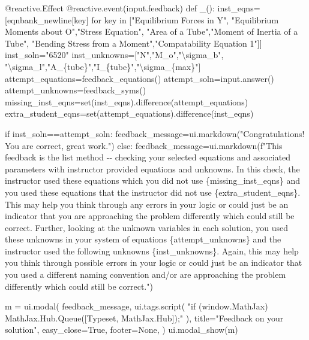 \documentclass[
  letterpaper,
  DIV=11,
  numbers=noendperiod]{scrreprt}
\newenvironment{Shaded}{\begin{snugshade}}{\end{snugshade}}
\newcommand{\NormalTok}[1]{\textcolor[rgb]{0.00,0.23,0.31}{#1}}
\begin{document}
\begin{Shaded}
\begin{Highlighting}[]
                
\NormalTok{    @reactive.Effect}
\NormalTok{    @reactive.event(input.feedback)}
\NormalTok{    def \_():}
\NormalTok{        inst\_eqns=[eqnbank\_newline[key] for key in ["Equilibrium Forces in Y", "Equilibrium Moments about O","Stress Equation", "Area of a Tube","Moment of Inertia of a Tube", "Bending Stress from a Moment","Compatability Equation 1"]]}
\NormalTok{        inst\_soln="6520"}
\NormalTok{        inst\_unknowns=["N","M\_o","\textbackslash{}sigma\_b", "\textbackslash{}sigma\_l","A\_\{tube\}","I\_\{tube\}","\textbackslash{}sigma\_\{max\}"]}
\NormalTok{        attempt\_equations=feedback\_equations()}
\NormalTok{        attempt\_soln=input.answer()}
\NormalTok{        attempt\_unknowns=feedback\_syms()}
\NormalTok{        missing\_inst\_eqns=set(inst\_eqns).difference(attempt\_equations)}
\NormalTok{        extra\_student\_eqns=set(attempt\_equations).difference(inst\_eqns)}
        
\NormalTok{        if inst\_soln==attempt\_soln:}
\NormalTok{          feedback\_message=ui.markdown("Congratulations! You are correct, great work.")}
\NormalTok{        else:}
\NormalTok{          feedback\_message=ui.markdown(f"This feedback is the list method {-}{-} checking your selected equations and associated parameters with instructor provided equations and unknowns. In this check, the instructor used these equations which you did not use \{missing\_inst\_eqns\} and you used these equations that the instructor did not use \{extra\_student\_eqns\}. This may help you think through any errors in your logic or could just be an indicator that you are approaching the problem differently which could still be correct. Further, looking at the unknown variables in each solution, you used these unknowns in your system of equations \{attempt\_unknowns\} and the instructor used the following unknowns \{inst\_unknowns\}. Again, this may help you think through possible errors in your logic or could just be an indicator that you used a different naming convention and/or are approaching the problem differently which could still be correct.")}
        
\NormalTok{        m = ui.modal(}
\NormalTok{            feedback\_message, ui.tags.script(}
\NormalTok{                "if (window.MathJax) MathJax.Hub.Queue([\textquotesingle{}Typeset\textquotesingle{}, MathJax.Hub]);"}
\NormalTok{                ),}
\NormalTok{            title="Feedback on your solution",}
\NormalTok{            easy\_close=True,}
\NormalTok{            footer=None,}
\NormalTok{        )}
\NormalTok{        ui.modal\_show(m)}
        

\end{Highlighting}
\end{Shaded}
\end{document}

